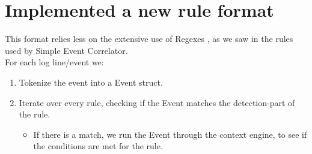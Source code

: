 \section{Implemented a new rule format}
This format relies less on the extensive use of Regexes , as we saw in the rules used by Simple Event Correlator. 
\\
For each log line/event we:

\begin{enumerate}
    \item Tokenize the event into a Event struct. 
    \item Iterate over every rule, checking if the Event matches the detection-part of the rule.
    \begin{itemize}
        \item If there is a match, we run the Event through the context engine, to see if the conditions are met for the rule.
    \end{itemize}
\end{enumerate}

